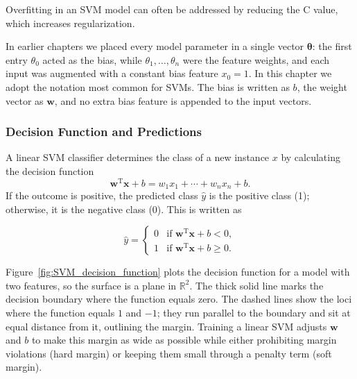 \documentclass[12pt,letter]{article}
\begin{document}
\begin{mdframed}[middlelinewidth=0.5mm]
\begin{center}
\end{center}
Overfitting in an SVM model can often be addressed by reducing the C value, which increases regularization.
\end{mdframed}


In earlier chapters we placed every model parameter in a single vector $\boldsymbol{\theta}$: the first entry $\theta_0$ acted as the bias, while $\theta_1,\dots,\theta_n$ were the feature weights, and each input was augmented with a constant bias feature $x_0 = 1$. In this chapter we adopt the notation most common for SVMs. The bias is written as $b$, the weight vector as $\mathbf{w}$, and no extra bias feature is appended to the input vectors.



\subsubsection{Decision Function and Predictions}
A linear SVM classifier determines the class of a new instance $x$ by calculating the decision function
\begin{equation}
\textbf{w}^\text{T} \textbf{x} + b = w_1 x_1 + \cdots + w_n x_n + b.
\end{equation}
If the outcome is positive, the predicted class $\hat{y}$ is the positive class (1); otherwise, it is the negative class (0). This is written as 

\begin{equation}
  \hat{y} = 
  \begin{cases}
  0 & \text{if } \textbf{w}^\text{T} \textbf{x} + b < 0, \\
  1 & \text{if } \textbf{w}^\text{T} \textbf{x} + b \ge 0.
  \end{cases}
\label{eq:Linear_SVM_classifier_prediction}
\end{equation}

Figure~\ref{fig:SVM_decision_function} plots the decision function for a model with two features, so the surface is a plane in $\mathbb{R}^{2}$. The thick solid line marks the decision boundary where the function equals zero. The dashed lines show the loci where the function equals $1$ and $-1$; they run parallel to the boundary and sit at equal distance from it, outlining the margin. Training a linear SVM adjusts $\mathbf{w}$ and $b$ to make this margin as wide as possible while either prohibiting margin violations (hard margin) or keeping them small through a penalty term (soft margin).
\end{document}
